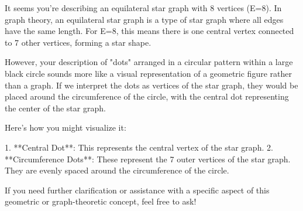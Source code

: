 It seems you're describing an equilateral star graph with 8 vertices (E=8). In graph theory, an equilateral star graph is a type of star graph where all edges have the same length. For E=8, this means there is one central vertex connected to 7 other vertices, forming a star shape.

However, your description of "dots" arranged in a circular pattern within a large black circle sounds more like a visual representation of a geometric figure rather than a graph. If we interpret the dots as vertices of the star graph, they would be placed around the circumference of the circle, with the central dot representing the center of the star graph.

Here's how you might visualize it:

1. **Central Dot**: This represents the central vertex of the star graph.
2. **Circumference Dots**: These represent the 7 outer vertices of the star graph. They are evenly spaced around the circumference of the circle.

If you need further clarification or assistance with a specific aspect of this geometric or graph-theoretic concept, feel free to ask!